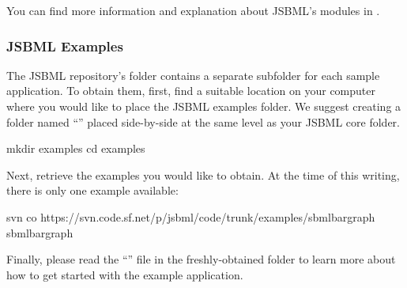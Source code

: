 You can find more information and explanation about JSBML's modules in .


\subsubsection{JSBML Examples}
\label{sec:jsbml-repo-examples}

The JSBML repository's  folder contains a separate
subfolder for each sample application.  To obtain them, first, find a
suitable location on your computer where you would like to place the JSBML
examples folder.  We suggest creating a folder named ``''
placed side-by-side at the same level as your JSBML core folder.

\begin{example}[style=bash, title={Creating a folder for the examples.}]
mkdir examples
cd examples
\end{example}

Next, retrieve the examples you would like to obtain.  At the time of this
writing, there is only one example available:

\begin{example}[style=bash, title={Retrieving the \emph{SBML Bar Graph}
    example application.}] 
svn co https://svn.code.sf.net/p/jsbml/code/trunk/examples/sbmlbargraph sbmlbargraph
\end{example}

Finally, please read the ``'' file in the freshly-obtained
 folder to learn more about how to get started with the
example application.


